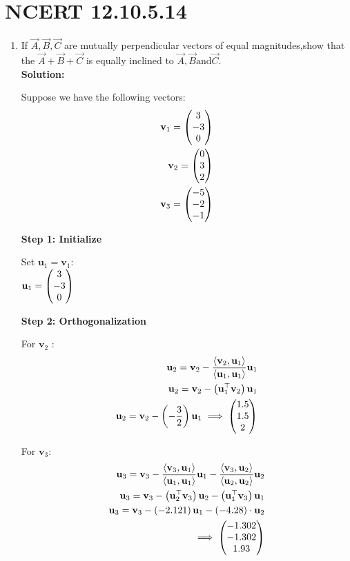 \documentclass[11pt]{book}
\begin{document}
\section*{NCERT 12.10.5.14}
\begin{enumerate}
    \item If $ \vec{A},\vec{B},\vec{C} $ are mutually perpendicular vectors of equal magnitudes,show that the  $ \vec{A}+\vec{B}+\vec{C} $ is equally inclined to $ \vec{A},\vec{B}  \text{and}  \vec{C} $.\\
    \textbf{Solution:}
    
    Suppose we have the following vectors:
    \begin{align*}
        \mathbf{v}_1 = \begin{pmatrix}3 \\-3 \\0\end{pmatrix}  \\
        \mathbf{v}_2 = \begin{pmatrix}0\\ 3\\ 2\end{pmatrix}  \\
        \mathbf{v}_3 = \begin{pmatrix}-5\\-2\\ -1\end{pmatrix}
    \end{align*}
        

\textbf{Step 1: Initialize}

Set $\mathbf{u}_1 = \mathbf{v}_1$:\\

 $\mathbf{u}_1 = \begin{pmatrix}3\\ -3\\ 0\end{pmatrix} $
 

\textbf{Step 2: Orthogonalization}

For  $ \mathbf{v}_2$ :
 \begin{align}
     \mathbf{u}_2 = \mathbf{v}_2 - \frac{\langle \mathbf{v}_2, \mathbf{u}_1 \rangle}{\langle \mathbf{u}_1, \mathbf{u}_1 \rangle} \mathbf{u}_1 \\
     \mathbf{u}_2=\mathbf{v}_2- \left(\mathbf{u}_1 ^\top \mathbf{v}_2\right) \mathbf{u}_1\\ 
     \mathbf{u}_2 = \mathbf{v}_2 - \left(-\frac{3}{2}\right) \mathbf{u}_1 
     \implies \begin{pmatrix}1.5\\1.5\\2 \end{pmatrix}
 \end{align}

For $\mathbf{v}_3 $:
\begin{align}
    \mathbf{u}_3 = \mathbf{v}_3 - \frac{\langle \mathbf{v}_3, \mathbf{u}_1 \rangle}{\langle \mathbf{u}_1, \mathbf{u}_1 \rangle} \mathbf{u}_1 - \frac{\langle \mathbf{v}_3, \mathbf{u}_2 \rangle}{\langle \mathbf{u}_2, \mathbf{u}_2 \rangle} \mathbf{u}_2 \\
    \mathbf{u}_3=\mathbf{v}_3- \left(\mathbf{u}_2 ^\top \mathbf{v}_3\right) \mathbf{u}_2- \left(\mathbf{u}_1 ^\top \mathbf{v}_3\right) \mathbf{u}_1\\ 
\mathbf{u}_3 = \mathbf{v}_3 - \left(-2.121\right) \mathbf{u}_1 - \left(-4.28\right) \cdot \mathbf{u}_2 \\
\implies\begin{pmatrix}-1.302\\ -1.302\\ 1.93\end{pmatrix} 
\end{align}


\end{enumerate}
\end{document}
